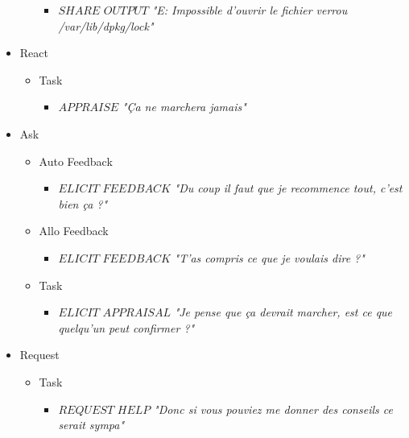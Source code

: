 \begin{itemize}
\begin{itemize}
\begin{itemize}
					\item $SHARE$ $OUTPUT$
						\newline \textit{"E: Impossible d'ouvrir le fichier verrou /var/lib/dpkg/lock"}
				\end{itemize}
		\end{itemize}
	\item React
		\begin{itemize}
			\item Task
				\begin{itemize}
					\item $APPRAISE$
						\newline \textit{"Ça ne marchera jamais"}
				\end{itemize}
		\end{itemize}
	\item Ask
		\begin{itemize}
			\item Auto Feedback
				\begin{itemize}
					\item $ELICIT$ $FEEDBACK$
						\newline \textit{"Du coup il faut que je recommence tout, c'est bien ça ?"}
				\end{itemize}
			\item Allo Feedback
				\begin{itemize}
					\item $ELICIT$ $FEEDBACK$
						\newline \textit{"T'as compris ce que je voulais dire ?"}
				\end{itemize}
			\item Task
				\begin{itemize}
					\item $ELICIT$ $APPRAISAL$
						\newline \textit{"Je pense que ça devrait marcher, est ce que quelqu'un peut confirmer ?"}
				\end{itemize}
		\end{itemize}
	\item Request
		\begin{itemize}
			\item Task
				\begin{itemize}
					\item $REQUEST$ $HELP$
						\newline \textit{"Donc si vous pouviez me donner des conseils ce serait sympa"}
				\end{itemize}
		\end{itemize}

\end{itemize}
